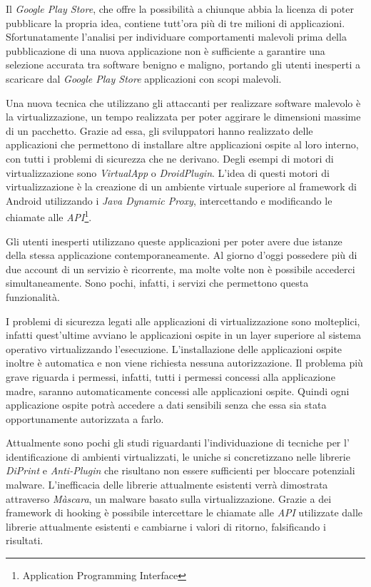 

Il \emph{Google Play Store}, che offre la possibilità a chiunque abbia la licenza di poter pubblicare la propria idea, contiene tutt'ora più di tre milioni di applicazioni.
Sfortunatamente l'analisi per individuare comportamenti malevoli prima della pubblicazione di una nuova applicazione non è sufficiente a garantire una selezione accurata tra software benigno e maligno, portando gli utenti inesperti a scaricare dal \emph{Google Play Store} applicazioni con scopi malevoli. 

Una nuova tecnica che utilizzano gli attaccanti per realizzare software malevolo è la virtualizzazione, un tempo realizzata per poter aggirare le dimensioni massime di un pacchetto.
Grazie ad essa, gli sviluppatori hanno realizzato delle applicazioni che permettono di installare altre applicazioni ospite al loro interno, con tutti i problemi di sicurezza che ne derivano. Degli esempi di motori di virtualizzazione sono \emph{VirtualApp} o \emph{DroidPlugin}. L'idea di questi motori di virtualizzazione è la creazione di un ambiente virtuale superiore al framework di Android utilizzando i \emph{Java Dynamic Proxy}, intercettando e modificando le chiamate alle \emph{API}\footnote{Application Programming Interface}.

Gli utenti inesperti utilizzano queste applicazioni per poter avere due istanze della stessa applicazione contemporaneamente. Al giorno d'oggi possedere più di due account di un servizio è ricorrente, ma molte volte non è possibile accederci simultaneamente. Sono pochi, infatti, i servizi che permettono questa funzionalità.

I problemi di sicurezza legati alle applicazioni di virtualizzazione sono molteplici, infatti quest'ultime avviano le applicazioni ospite in un layer superiore al sistema operativo virtualizzando l'esecuzione. L'installazione delle applicazioni ospite inoltre è automatica e non viene richiesta nessuna autorizzazione. Il problema più grave riguarda i permessi, infatti, tutti i permessi concessi alla applicazione madre, saranno automaticamente concessi alle applicazioni ospite. Quindi ogni applicazione ospite potrà accedere a dati sensibili senza che essa sia stata opportunamente autorizzata a farlo.

Attualmente sono pochi gli studi riguardanti l'individuazione di tecniche per l' identificazione di ambienti virtualizzati, le uniche si concretizzano nelle librerie \emph{DiPrint} e \emph{Anti-Plugin} che risultano non essere sufficienti per bloccare potenziali malware. L'inefficacia delle librerie attualmente esistenti verrà dimostrata attraverso \emph{Màscara}, un malware basato sulla virtualizzazione. Grazie a dei framework di hooking è possibile intercettare le chiamate alle \emph{API} utilizzate dalle librerie attualmente esistenti e cambiarne i valori di ritorno, falsificando i risultati.

